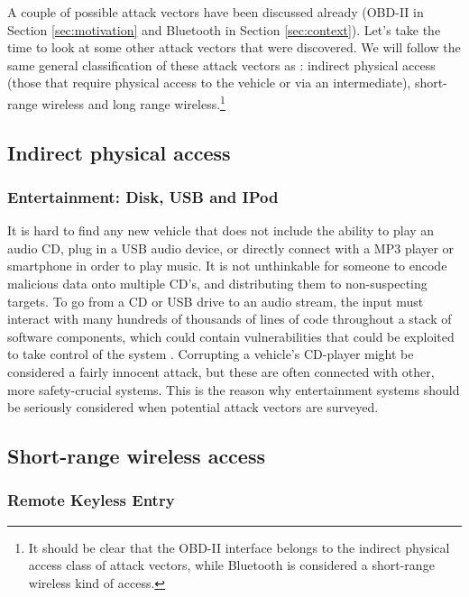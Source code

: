 A couple of possible attack vectors have been discussed already (OBD-II in Section \ref{sec:motivation} and Bluetooth in Section \ref{sec:context}). Let's take the time to look at some other attack vectors that were discovered. We will follow the same general classification of these attack vectors as \cite{Kosher}: indirect physical access (those that require physical access to the vehicle or via an intermediate), short-range wireless and long range wireless.\footnote{It should be clear that the OBD-II interface belongs to the indirect physical access class of attack vectors, while Bluetooth is considered a short-range wireless kind of access.}

\subsection{Indirect physical access}
\label{subsec:indirect_physical_access}

\subsubsection{Entertainment: Disk, USB and IPod} 
\label{subsubsec:entertainment}
It is hard to find any new vehicle that does not include the ability to play an audio CD, plug in a USB audio device, or directly connect with a MP3 player or smartphone in order to play music. It is not unthinkable for someone to encode malicious data onto multiple CD's, and distributing them to non-suspecting targets. To go from a CD or USB drive to an audio stream, the input must interact with many hundreds of thousands of lines of code throughout a stack of software components, which could contain vulnerabilities that could be exploited to take control of the system \cite{Pike15}. Corrupting a vehicle's CD-player might be considered a fairly innocent attack, but these are often connected with other, more safety-crucial systems. This is the reason why entertainment systems should be seriously considered when potential attack vectors are surveyed.

\subsection{Short-range wireless access}
\label{subsec:short-range_wireless_access}

\subsubsection{Remote Keyless Entry}
\label{subsubsec:rke}


